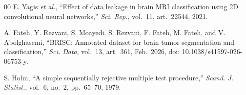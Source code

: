 \documentclass[journal]{IEEEtran}
\begin{document}
\begin{thebibliography}{00}
E. Yagis \emph{et al.}, ``Effect of data leakage in brain MRI classification
using 2D convolutional neural networks,'' \emph{Sci. Rep.}, vol.~11, art.~22544,
2021.

A. Fateh, Y. Rezvani, S. Moayedi, S. Rezvani, F. Fateh, M. Fateh, and
V. Abolghasemi, ``BRISC: Annotated dataset for brain tumor segmentation and
classification,'' \emph{Sci. Data}, vol.~13, art.~361, Feb.~2026,
doi: 10.1038/s41597-026-06753-y.

S. Holm, ``A simple sequentially rejective multiple test procedure,''
\emph{Scand. J. Statist.}, vol.~6, no.~2, pp.~65--70, 1979.

\end{thebibliography}
\end{document}
